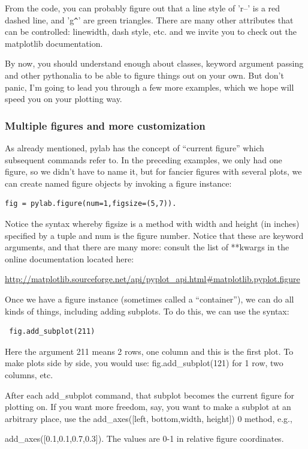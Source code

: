\documentclass[11pt]{book}
\begin{document}
{{\noindent   From the code, you can probably figure out that a line style of 'r--' is a red dashed line,  and 'g\verb|^|'  are green triangles.
There are many other attributes that can be controlled: linewidth, dash style, etc. and we invite you to check out the {\color{blue}matplotlib} documentation.

\noindent By now, you should understand enough about classes, keyword argument passing and other pythonalia to be able to figure things out on your own.   But don't panic, I'm going to lead you through a few more examples, which we hope will speed you on your plotting way.



\subsubsection{Multiple figures and more customization}
As already mentioned,  {\color{blue}pylab} has the concept of ``current figure'' which subsequent commands refer to.   In the preceding examples, we only had one figure, so we didn't have to name it, but for fancier figures with several plots, we
can create  named figure objects by invoking a {\color{blue}figure} instance:

 {\color{blue}\begin{verbatim}
fig = pylab.figure(num=1,figsize=(5,7)).
\end{verbatim}}

\noindent  Notice the syntax whereby {\color{blue} figsize}  is a method with  width and height (in inches) specified by a tuple and {\color{blue}num}  is the figure number.    Notice that these are keyword arguments, and that there are many more:  consult the list of  **kwargs in the online documentation  located here:

\url{http://matplotlib.sourceforge.net/api/pyplot_api.html#matplotlib.pyplot.figure }

Once we have a figure instance (sometimes called a ``container''), we can do all kinds of things, including adding subplots.  To do this, we can use the syntax:

{\color{blue}\begin{verbatim}
 fig.add_subplot(211)
 \end{verbatim}}
 \noindent Here the
argument  211 means 2 rows, one column and this is the first plot.  To make plots side by side, you would use: {\color{blue} fig.add\_subplot(121) } for  1 row, two columns, etc.

After each {\color{blue}add\_subplot} command, that subplot becomes the current figure for plotting on.
If you want more freedom, say, you want to make a subplot at an arbitrary place,  use the {\color{blue}add\_axes([left, bottom,width, height])} 0 method, e.g.,  {{\color{blue}add\_axes([0.1,0.1,0.7,0.3])}.  The values are 0-1 in relative figure coordinates.

}}}
\end{document}
